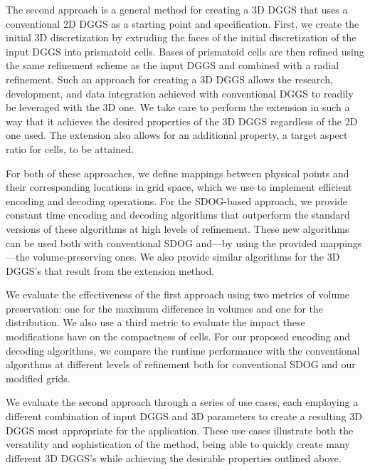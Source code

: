 The second approach is a general method for creating a 3D DGGS that uses a conventional 2D DGGS as a starting point and specification.
First, we create the initial 3D discretization by extruding the faces of the initial discretization of the input DGGS into prismatoid cells.
Bases of prismatoid cells are then refined using the same refinement scheme as the input DGGS and combined with a radial refinement.
Such an approach for creating a 3D DGGS allows the research, development, and data integration achieved with conventional DGGS to readily be leveraged with the 3D one.
We take care to perform the extension in such a way that it achieves the desired properties of the 3D DGGS regardless of the 2D one used.
The extension also allows for an additional property, a target aspect ratio for cells, to be attained.


For both of these approaches, we define mappings between physical points and their corresponding locations in grid space, which we use to implement efficient encoding and decoding operations.
For the SDOG-based approach, we provide constant time encoding and decoding algorithms that outperform the standard versions of these algorithms at high levels of refinement.
These new algorithms can be used both with conventional SDOG and---by using the provided mappings---the volume-preserving ones.
We also provide similar algorithms for the 3D DGGS's that result from the extension method.


We evaluate the effectiveness of the first approach using two metrics of volume preservation: one for the maximum difference in volumes and one for the distribution.
We also use a third metric to evaluate the impact these modifications have on the compactness of cells.
For our proposed encoding and decoding algorithms, we compare the runtime performance with the conventional algorithms at different levels of refinement both for conventional SDOG and our modified grids.


We evaluate the second approach through a series of use cases, each employing a different combination of input DGGS and 3D parameters to create a resulting 3D DGGS most appropriate for the application.
These use cases illustrate both the versatility and sophistication of the method, being able to quickly create many different 3D DGGS's while achieving the desirable properties outlined above.



